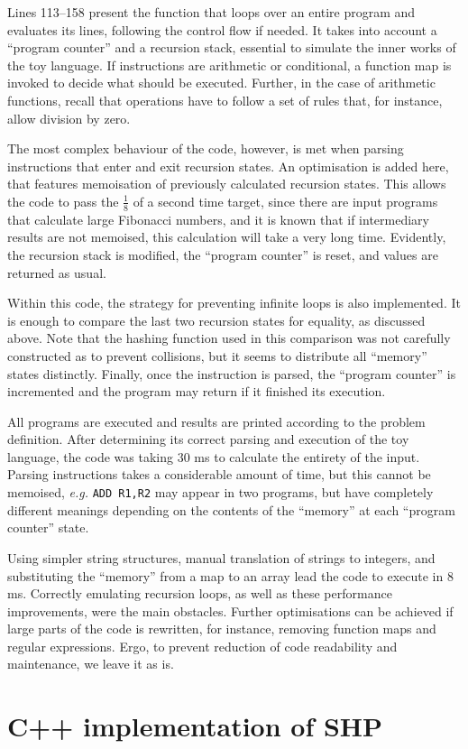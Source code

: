 \documentclass[12pt]{article}
\begin{document}
Lines 113--158 present the function that loops over an entire program and evaluates its lines, following the control flow if needed. It takes into account a ``program counter'' and a recursion stack, essential to simulate the inner works of the toy language. If instructions are arithmetic or conditional, a function map is invoked to decide what should be executed. Further, in the case of arithmetic functions, recall that operations have to follow a set of rules that, for instance, allow division by zero.

The most complex behaviour of the code, however, is met when parsing instructions that enter and exit recursion states. An optimisation is added here, that features memoisation of previously calculated recursion states. This allows the code to pass the $\frac{1}{8}$ of a second time target, since there are input programs that calculate large Fibonacci numbers, and it is known that if intermediary results are not memoised, this calculation will take a very long time. Evidently, the recursion stack is modified, the ``program counter'' is reset, and values are returned as usual.

Within this code, the strategy for preventing infinite loops is also implemented. It is enough to compare the last two recursion states for equality, as discussed above. Note that the hashing function used in this comparison was not carefully constructed as to prevent collisions, but it seems to distribute all ``memory'' states distinctly. Finally, once the instruction is parsed, the ``program counter'' is incremented and the program may return if it finished its execution.

All programs are executed and results are printed according to the problem definition. After determining its correct parsing and execution of the toy language, the code was taking $30$ ms to calculate the entirety of the input. Parsing instructions takes a considerable amount of time, but this cannot be memoised, \emph{e.g.} \texttt{ADD R1,R2} may appear in two programs, but have completely different meanings depending on the contents of the ``memory'' at each ``program counter'' state.

Using simpler string structures, manual translation of strings to integers, and substituting the ``memory'' from a map to an array lead the code to execute in $8$ ms. Correctly emulating recursion loops, as well as these performance improvements, were the main obstacles. Further optimisations can be achieved if large parts of the code is rewritten, for instance, removing function maps and regular expressions. Ergo, to prevent reduction of code readability and maintenance, we leave it as is.




\appendix

\section{C++ implementation of SHP}\label{app:impl}

\end{document}
